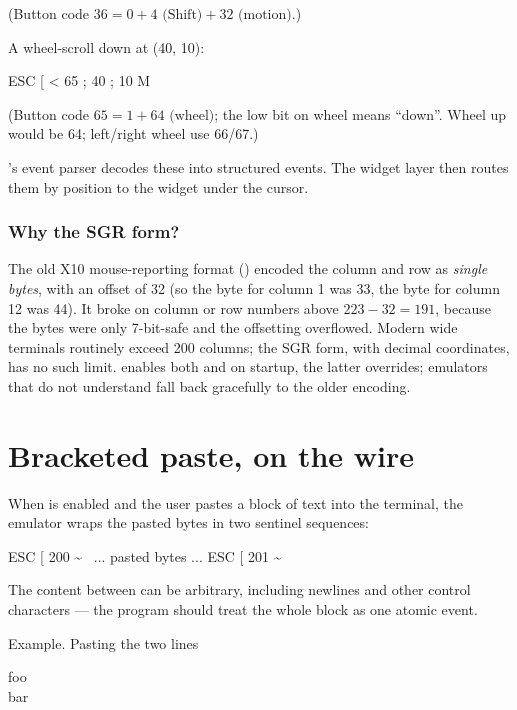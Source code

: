 (Button code $36 = 0 + 4 \text{ (Shift)} + 32 \text{ (motion)}$.)

A wheel-scroll down at (40, 10):

\begin{terminalbox}
ESC [ < 65 ; 40 ; 10 M
\end{terminalbox}

(Button code $65 = 1 + 64 \text{ (wheel)}$; the low bit on wheel
means ``down''. Wheel up would be 64; left/right wheel use 66/67.)

\maya{}'s event parser decodes these into structured
 events. The widget layer then routes them by position
to the widget under the cursor.

\subsubsection*{Why the SGR form?}

The old X10 mouse-reporting format () encoded the
column and row as \emph{single bytes}, with an offset of 32 (so the
byte for column 1 was 33, the byte for column 12 was 44). It broke
on column or row numbers above $223 - 32 = 191$, because the bytes
were only 7-bit-safe and the offsetting overflowed. Modern wide
terminals routinely exceed 200 columns; the SGR form, with decimal
coordinates, has no such limit. \maya{} enables both 
and  on startup, the latter overrides; emulators that
do not understand  fall back gracefully to the older
encoding.

\section{Bracketed paste, on the wire}
\label{sec:term:paste}

When  is enabled and the user pastes a block of text
into the terminal, the emulator wraps the pasted bytes in two
sentinel sequences:

\begin{terminalbox}
ESC [ 200 \textasciitilde~ ... pasted bytes ... ESC [ 201 \textasciitilde
\end{terminalbox}

The content between can be arbitrary, including newlines and other
control characters --- the program should treat the whole block
as one atomic event.

Example. Pasting the two lines

\begin{terminalbox}
foo \\
bar
\end{terminalbox}

